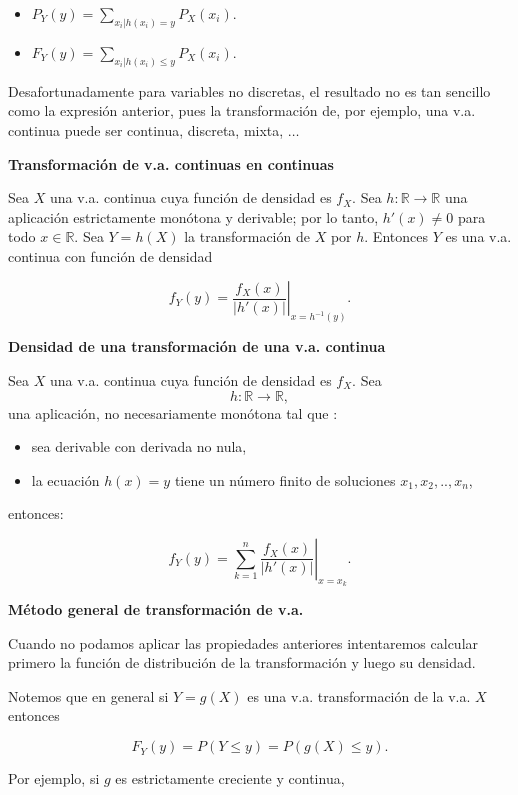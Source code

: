 \documentclass[
  letterpaper,
  DIV=11,
  numbers=noendperiod]{scrreprt}
\providecommand{\tightlist}{%
  \setlength{\itemsep}{0pt}\setlength{\parskip}{0pt}}\usepackage{longtable,booktabs,array}
\begin{document}
\begin{itemize}
\tightlist
\item
  \(\displaystyle P_{Y}(y)=\sum_{x_{i}|h(x_{i})=y}P_X(x_{i}).\)
\item
  \(\displaystyle F_{Y}(y)=\sum_{x_{i}|h(x_{i})\leq y} P_X(x_{i}).\)
\end{itemize}

Desafortunadamente para variables no discretas, el resultado no es tan
sencillo como la expresión anterior, pues la transformación de, por
ejemplo, una v.a. continua puede ser continua, discreta, mixta,
\(\ldots\)

\textbf{Transformación de v.a. continuas en continuas}

Sea \(X\) una v.a. continua cuya función de densidad es \(f_{X}\). Sea
\(h:\mathbb{R}\to\mathbb{R}\) una aplicación estrictamente monótona y
derivable; por lo tanto, \(h'(x)\not=0\) para todo \(x\in\mathbb{R}\).
Sea \(Y=h(X)\) la transformación de \(X\) por \(h\). Entonces \(Y\) es
una v.a. continua con función de densidad

\[f_{Y}(y)=\left.\frac{f_{X}(x)}
{\left|h'(x)\right|}\right|_{x=h^{-1}(y)}.\]

\textbf{Densidad de una transformación de una v.a. continua}

Sea \(X\) una v.a. continua cuya función de densidad es \(f_{X}\). Sea
\[h:\mathbb{R}\to\mathbb{R},\] una aplicación, no necesariamente
monótona tal que :

\begin{itemize}
\tightlist
\item
  sea derivable con derivada no nula,
\item
  la ecuación \(h(x)=y\) tiene un número finito de soluciones
  \(x_1,x_2,..,x_{n}\),
\end{itemize}

entonces:

\[
\displaystyle f_{Y}(y)=\left.\sum_{k=1}^{n} \frac{f_{X}(x)}
{\left|h'(x)\right|}\right|_{x=x_{k}}.
\]

\textbf{Método general de transformación de v.a.}

Cuando no podamos aplicar las propiedades anteriores intentaremos
calcular primero la función de distribución de la transformación y luego
su densidad.

Notemos que en general si \(Y=g(X)\) es una v.a. transformación de la
v.a. \(X\) entonces

\[
F_{Y}(y)=P(Y\leq y)=P(g(X)\leq y).
\]

Por ejemplo, si \(g\) es estrictamente creciente y continua,
\end{document}

